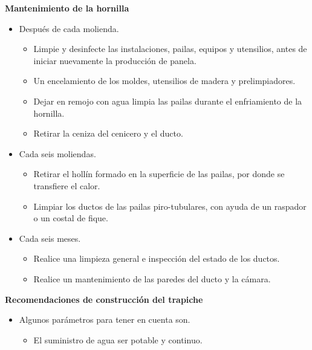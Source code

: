 \documentclass{article}%
\begin{document}
\begin{large}
\begin{itemize}
\begin{itemize}
\end{itemize}%
\end{itemize}%
\begin{Large}%
\textbf{Mantenimiento de la hornilla}%
\end{Large}%
\begin{itemize}%
\item%
Después de cada molienda.%
\begin{itemize}%
\item%
Limpie y desinfecte las instalaciones, pailas, equipos y utensilios, antes de iniciar nuevamente la producción de panela.%
\item%
Un encelamiento de los moldes, utensilios de madera y prelimpiadores.%
\item%
Dejar en remojo con agua limpia las pailas durante el enfriamiento de la hornilla.%
\item%
Retirar la ceniza del cenicero y el ducto.%
\end{itemize}%
\end{itemize}%
\begin{itemize}%
\item%
Cada seis moliendas.%
\begin{itemize}%
\item%
Retirar el hollín formado en la superficie de las pailas, por donde se transfiere el calor.%
\item%
Limpiar los ductos de las pailas piro{-}tubulares, con ayuda de un raspador o un costal de fique.%
\end{itemize}%
\end{itemize}%
\begin{itemize}%
\item%
Cada seis meses.%
\begin{itemize}%
\item%
Realice una limpieza general e inspección del estado de los ductos.%
\item%
Realice un mantenimiento de las paredes del ducto y la cámara.%
\end{itemize}%
\end{itemize}%
\begin{Large}%
\textbf{Recomendaciones de construcción del trapiche}%
\end{Large}%
\begin{itemize}%
\item%
Algunos parámetros para tener en cuenta son.%
\begin{itemize}%
\item%
El suministro de agua ser potable y continuo.%

\end{itemize}
\end{itemize}
\end{large}
\end{document}
